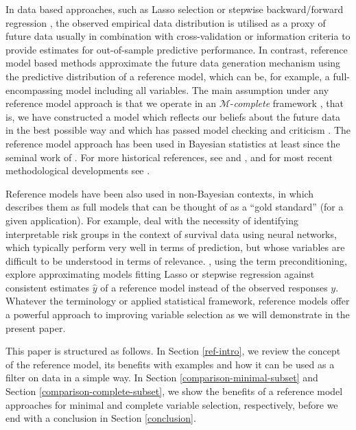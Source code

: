 \documentclass[a4]{article}
\theoremstyle{definition}
\begin{document}
In data based approaches, such as Lasso selection
\citep{tibshirani1996regression} or stepwise backward/forward
regression \citep{venables2013modern,harrell2015regression}, the
observed empirical data distribution is utilised as a proxy of future
data usually in combination with cross-validation or information
criteria to provide estimates for out-of-sample predictive
performance.  In contrast, reference model based methods approximate
the future data generation mechanism using the predictive distribution
of a reference model, which can be, for example, a full-encompassing
model including all variables.  The main assumption under any
reference model approach is that we operate in an
$\mathcal{M}$-\textit{complete} framework
\citep{book:bernardo_smith,vehtari2012survey}, that is, we have
constructed a model which reflects our beliefs about
the future data in the best possible way and which has passed model checking and criticism
\citep[see, e.g.][]{gelman2013bayesian,gabry2019visualization}.  The reference model approach
has been used in Bayesian statistics at least since the seminal
work of \citet{paper:reference_lindley}. For more historical
references, see \citet{vehtari2012survey} and
\citet{paper:model_selection}, and for most recent methodological
developments see \citet{paper:projpred}.

Reference models have been also used in non-Bayesian contexts, in which
\cite{harrell2015regression} describes them as full models that can be
thought of as a ``gold standard'' (for a given application).  For
example, \cite{faraggi2001understanding} deal with the necessity of
identifying interpretable risk groups in the context of survival data
using neural networks, which typically perform very well in terms of
prediction, but whose variables are difficult to be understood in
terms of relevance.  \cite{paul2008preconditioning}, using the term
preconditioning, explore approximating models fitting Lasso or
stepwise regression against consistent estimates $\hat{y}$ of a
reference model instead of the observed responses $y$.
Whatever the terminology or applied statistical framework, reference
models offer a powerful approach to improving variable selection as we
will demonstrate in the present paper.

This paper is structured as follows. In Section
\ref{ref-intro}, we review the concept of the reference
model, its benefits with examples and how it can be used as a filter
on data in a simple way. In Section \ref{comparison-minimal-subset} and 
Section \ref{comparison-complete-subset}, we show the
benefits of a reference model approaches for minimal and complete 
variable selection, respectively, before we end with a conclusion in Section \ref{conclusion}.
\end{document}
